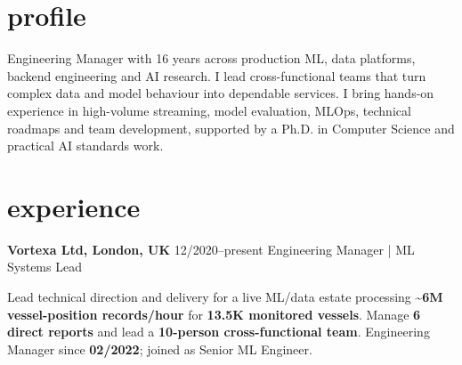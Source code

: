 \documentclass[]{../../../../friggeri-cv}
\renewcommand{\entry}[4]{%
  \parbox[t]{\dimexpr\textwidth-\entryleftinset\relax}{%
    \textbf{#2}%
    {\footnotesize\addfontfeature{Color=lightgray}\hspace{0.6em}#1}%
    \hfill%
    {\small\color{textcolor} #3}\\%
    #4\vspace{\parsep}%
  }\\}
\begin{document}
\section{profile}
{\normalsize Engineering Manager with 16 years across production ML, data platforms, backend engineering and AI research. I lead cross-functional teams that turn complex data and model behaviour into dependable services. I bring hands-on experience in high-volume streaming, model evaluation, MLOps, technical roadmaps and team development, supported by a Ph.D. in Computer Science and practical AI standards work.}
\section{experience}
\begin{entrylist}
    \entry
    {12/2020--present}
    {Vortexa Ltd, London, UK}
    {Engineering Manager | ML Systems Lead}
    {
        {\small
        \setlength{\parindent}{0pt}
        \setlength{\leftskip}{0pt}
        Lead technical direction and delivery for a live ML/data estate processing \textbf{\textasciitilde6M vessel-position records/hour} for \textbf{13.5K monitored vessels}. Manage \textbf{6 direct reports} and lead a \textbf{10-person cross-functional team}. Engineering Manager since \textbf{02/2022}; joined as Senior ML Engineer.

}}
\end{entrylist}
\end{document}
